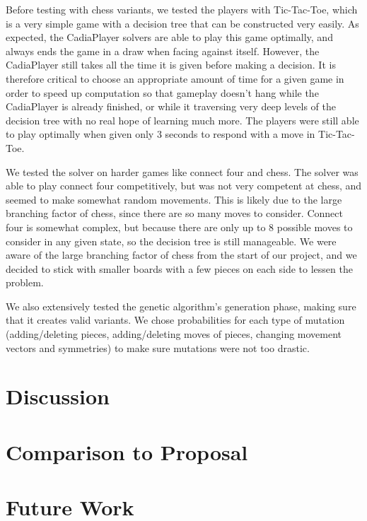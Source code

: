 \documentclass[11pt,letterpaper]{article}
\begin{document}
Before testing with chess variants, we tested the players with Tic-Tac-Toe, which is a very simple game with a decision tree that can be constructed very easily. As expected, the CadiaPlayer solvers are able to play this game optimally, and always ends the game in a draw when facing against itself. However, the CadiaPlayer still takes all the time it is given before making a decision. It is therefore critical to choose an appropriate amount of time for a given game in order to speed up computation so that gameplay doesn't hang while the CadiaPlayer is already finished, or while it traversing very deep levels of the decision tree with no real hope of learning much more. The players were still able to play optimally when given only 3 seconds to respond with a move in Tic-Tac-Toe.

We tested the solver on harder games like connect four and chess. The solver was able to play connect four competitively, but was not very competent at chess, and seemed to make somewhat random movements. This is likely due to the large branching factor of chess, since there are so many moves to consider. Connect four is somewhat complex, but because there are only up to 8 possible moves to consider in any given state, so the decision tree is still manageable. We were aware of the large branching factor of chess from the start of our project, and we decided to stick with smaller boards with a few pieces on each side to lessen the problem.

We also extensively tested the genetic algorithm's generation phase, making sure that it creates valid variants. We chose probabilities for each type of mutation (adding/deleting pieces, adding/deleting moves of pieces, changing movement vectors and symmetries) to make sure mutations were not too drastic.

\section{Discussion}

\section{Comparison to Proposal}


\section{Future Work}
\end{document}
